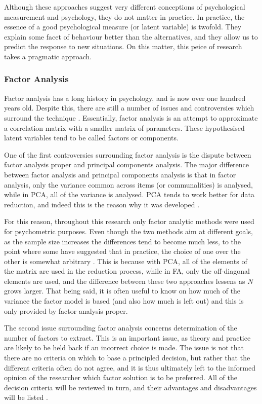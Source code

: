 Although these approaches suggest very different conceptions of psychological measurement and psychology, they do not matter in practice. In practice, the essence of a good psychological measure (or latent variable) is twofold. They explain some facet of behaviour better than the alternatives, and they allow us to predict the response to new situations. On this matter, this peice of research takes a pragmatic approach.  

\subsubsection{Factor Analysis}

Factor analysis has a long history in psychology, and is now over one hundred years old. Despite this, there are still a number of issues and controversies which surround the technique \cite{henson2006use}\cite{sass2010comparative}. Essentially, factor analysis is an attempt to approximate a correlation matrix with a smaller matrix of parameters. These hypothesised latent variables tend to be called factors or components.

 One of the first controversies surrounding factor analysis is the dispute between factor analysis proper and principal components analysis\cite{henson2006use}. The major difference between factor analysis and principal components analysis is that in factor analysis, only the variance common across items (or communalities) is analysed, while in PCA, all of the variance is analysed. PCA tends to work better for data reduction, and indeed this is the reason why it was developed \cite{borsboom2006attack}. 

For this reason, throughout this research only factor analytic methods were used for psychometric purposes. Even though the two methods aim at different goals, as the sample size increases the differences tend to become much less, to the point where some have suggested that in practice, the choice of one over the other is somewhat arbitrary \cite{henson2006use}. This is because with PCA, all of the elements of the matrix are used in the reduction process, while in FA, only the off-diagonal elements are used, and the difference between these two approaches lessens as $N$ grows larger. That being said, it is often useful to know on how much of the variance the factor model is based (and also how much is left out) and this is only provided by factor analysis proper.

The second issue surrounding factor analysis concerns determination of the number of factors to extract\cite{zwick1986comparison}. This is an important issue, as theory and practice are likely to be held back if an incorrect choice is made. The issue is not that there are no criteria on which to base a principled decision, but rather that the different criteria often do not agree, and it is thus ultimately left to the informed opinion of the researcher which factor solution is to be preferred. All of the decision criteria will be reviewed in turn, and their advantages and disadvantages will be listed \cite{henson2006use} . 

